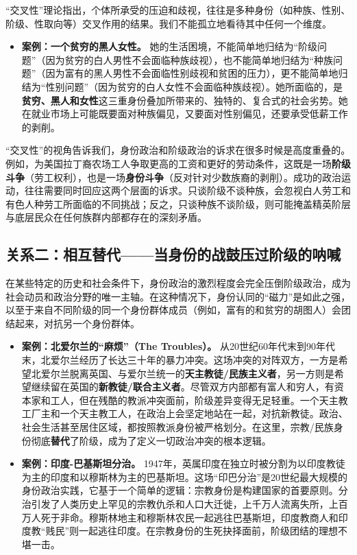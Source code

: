 “交叉性”理论指出，个体所承受的压迫和歧视，往往是多种身份（如种族、性别、阶级、性取向等）交叉作用的结果。我们不能孤立地看待其中任何一个维度。
\begin{itemize}
    \item \textbf{案例：一个贫穷的黑人女性。} 她的生活困境，不能简单地归结为“阶级问题”（因为贫穷的白人男性不会面临种族歧视），也不能简单地归结为“种族问题”（因为富有的黑人男性不会面临性别歧视和贫困的压力），更不能简单地归结为“性别问题”（因为贫穷的白人女性不会面临种族歧视）。她所面临的，是\textbf{贫穷、黑人和女性}这三重身份叠加所带来的、独特的、复合式的社会劣势。她在就业市场上可能既要面对种族偏见，又要面对性别偏见，还要承受低薪工作的剥削。
\end{itemize}

“交叉性”的视角告诉我们，身份政治和阶级政治的诉求在很多时候是高度重叠的。例如，为美国拉丁裔农场工人争取更高的工资和更好的劳动条件，这既是一场\textbf{阶级斗争}（劳工权利），也是一场\textbf{身份斗争}（反对针对少数族裔的剥削）。成功的政治运动，往往需要同时回应这两个层面的诉求。只谈阶级不谈种族，会忽视白人劳工和有色人种劳工所面临的不同挑战；反之，只谈种族不谈阶级，则可能掩盖精英阶层与底层民众在任何族群内部都存在的深刻矛盾。

\subsection{关系二：相互替代——当身份的战鼓压过阶级的呐喊}

在某些特定的历史和社会条件下，身份政治的激烈程度会完全压倒阶级政治，成为社会动员和政治分野的唯一主轴。在这种情况下，身份认同的“磁力”是如此之强，以至于来自不同阶级的同一个身份群体成员（例如，富有的和贫穷的胡图人）会团结起来，对抗另一个身份群体。
\begin{itemize}
    \item \textbf{案例：北爱尔兰的“麻烦”（The Troubles）。} 从20世纪60年代末到90年代末，北爱尔兰经历了长达三十年的暴力冲突。这场冲突的对阵双方，一方是希望北爱尔兰脱离英国、与爱尔兰统一的\textbf{天主教徒/民族主义者}，另一方则是希望继续留在英国的\textbf{新教徒/联合主义者}。尽管双方内部都有富人和穷人，有资本家和工人，但在残酷的教派冲突面前，阶级差异变得无足轻重。一个天主教工厂主和一个天主教工人，在政治上会坚定地站在一起，对抗新教徒。政治、社会生活甚至居住区域，都按照教派身份被严格划分。在这里，宗教/民族身份彻底\textbf{替代}了阶级，成为了定义一切政治冲突的根本逻辑。

    \item \textbf{案例：印度-巴基斯坦分治。} 1947年，英属印度在独立时被分割为以印度教徒为主的印度和以穆斯林为主的巴基斯坦。这场“印巴分治”是20世纪最大规模的身份政治实践，它基于一个简单的逻辑：宗教身份是构建国家的首要原则。分治引发了人类历史上罕见的宗教仇杀和人口大迁徙，上千万人流离失所，上百万人死于非命。穆斯林地主和穆斯林农民一起逃往巴基斯坦，印度教商人和印度教“贱民”则一起逃往印度。在宗教身份的生死抉择面前，阶级团结的理想不堪一击。
\end{itemize}

